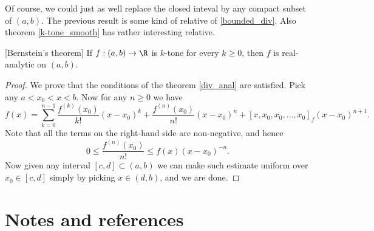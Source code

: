 Of course, we could just as well replace the closed inteval by any compact subset of $(a, b)$. The previous result is some kind of relative of \ref{bounded_div}. Also theorem \ref{k-tone_smooth} has rather interesting relative.

\begin{lause}\label{bernstein_theorem}[Bernstein's theorem]
	If $f : (a, b) \to \R$ is $k$-tone for every $k \geq 0$, then $f$ is real-analytic on $(a, b)$.
\end{lause}
\begin{proof}
	We prove that the conditions of the theorem \ref{div_anal} are satisfied. Pick any $a < x_{0} < x < b$. Now for any $n \geq 0$ we have
	\[
		f(x) = \sum_{k = 0}^{n - 1} \frac{f^{(k)}(x_{0})}{k!}(x - x_{0})^{k} + \frac{f^{(n)}(x_{0})}{n!} (x - x_{0})^{n} + [x, x_{0}, x_{0}, \ldots, x_{0}]_{f} (x - x_{0})^{n + 1}.
	\]
	Note that all the terms on the right-hand side are non-negative, and hence
	\[
		0 \leq \frac{f^{(n)}(x_{0})}{n!} \leq f(x) (x - x_{0})^{-n}.
	\]
	Now given any interval $[c, d] \subset (a, b)$ we can make such estimate uniform over $x_{0} \in [c, d]$ simply by picking $x \in (d, b)$, and we are done.
\end{proof}

\section{Notes and references}

